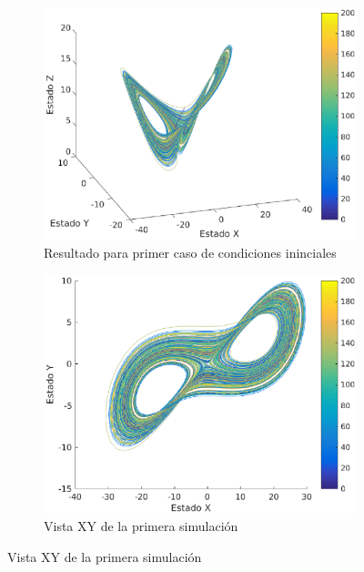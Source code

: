 \documentclass[12pt,letterpaper]{article}
\begin{document}
\begin{figure}
	\centering
	\begin{subfigure}[b]{0.36\textwidth}
		\includegraphics[width=\textwidth]{pictures/primera_simulacion}
		\caption{Resultado para primer caso de condiciones ininciales}
		\label{fig:simulacion1}
	\end{subfigure}
	\begin{subfigure}[b]{0.36\textwidth}
		\includegraphics[width=\textwidth]{pictures/primera_simulacion_xy}
		\caption{Vista XY de la primera simulación}
		\label{fig:simulacion1xy}

\end{subfigure}
\end{figure}
\end{document}
